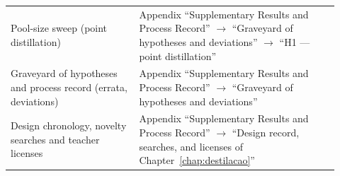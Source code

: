 \begin{table}[htbp]
\begin{tabular}{>{\raggedright\arraybackslash}p{0.36\linewidth}>{\raggedright\arraybackslash}p{0.56\linewidth}}
\addlinespace[2pt]
Pool-size sweep (point distillation) & Appendix ``Supplementary
Results and Process Record'' $\rightarrow$ ``Graveyard of hypotheses
and deviations'' $\rightarrow$ ``H1 --- point distillation'' \\
\addlinespace[2pt]
Graveyard of hypotheses and process record (errata, deviations) &
Appendix ``Supplementary Results and Process Record'' $\rightarrow$
``Graveyard of hypotheses and deviations'' \\
\addlinespace[2pt]
Design chronology, novelty searches and teacher licenses & Appendix
``Supplementary Results and Process Record'' $\rightarrow$ ``Design
record, searches, and licenses of
Chapter~\ref{chap:destilacao}'' \\
\bottomrule
\end{tabular}
\end{table}
